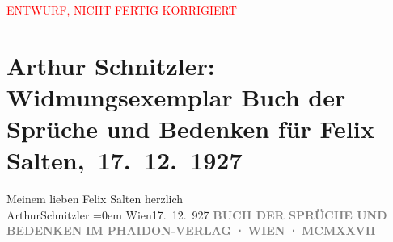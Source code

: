 
\begin{center}
            \textcolor{red}{ENTWURF, NICHT FERTIG KORRIGIERT}
                      \end{center}
            
         
         \renewcommand{\erwaehntePersonen}{Personen: Felix Salten}
         \renewcommand{\erwaehnteInstitutionen}{Institutionen: Phaidon-Verlag}
         \renewcommand{\erwaehnteOrte}{Orte: Wien}
         \renewcommand{\erwaehnteWerke}{Werke: Buch der Sprüche und Bedenken}
               \section[ Arthur Schnitzler: Widmungsexemplar Buch der Sprüche und Bedenken für Felix Salten, 17. 12. 1927]{ Arthur Schnitzler: Widmungsexemplar Buch der Sprüche und Bedenken für
               Felix Salten, 17. 12. 1927}\nopagebreak{}\rehead{ }\begin{ledgroupsized}[t]{13cm}\normalsize\beginnumbering \toendnotes[C]{\smallbreak\pagebreak[2]} 
\pstart
           \noindent{}{\pb}Meinem lieben Felix Salten\pend
           \pstart
           herzlich {\\[\baselineskip]}\spacefill\mbox{ArthurSchnitzler}\pend
           \leftskip=0em{}\pstart
           Wien17. 12. 927\pend
           {\bigskip}\pstart
           \noindent{}\centering{}{\pb}\textcolor{gray}{\textbf{}}\pend
           \pstart
           \noindent{}\centering{}\textcolor{gray}{\textbf{BUCH DER SPRÜCHE UND BEDENKEN}}\pend
           \pstart
           \noindent{}\centering{}\textcolor{gray}{\textbf{}}\pend
           {\bigskip}\pstart
           \noindent{}\centering{}\textcolor{gray}{\textbf{IM PHAIDON-VERLAG ⋅ WIEN ⋅ MCMXXVII}}\pend
           
         
         \endnumbering{}\end{ledgroupsized}  \newcommand{\dateiname}{L03610}\newcommand{\titel}{Arthur Schnitzler: Widmungsexemplar Buch der Sprüche und Bedenken für Felix Salten, 17. 12. 1927}\newcommand{\editorInnen}{Martin Anton Müller und Laura Untner}
      